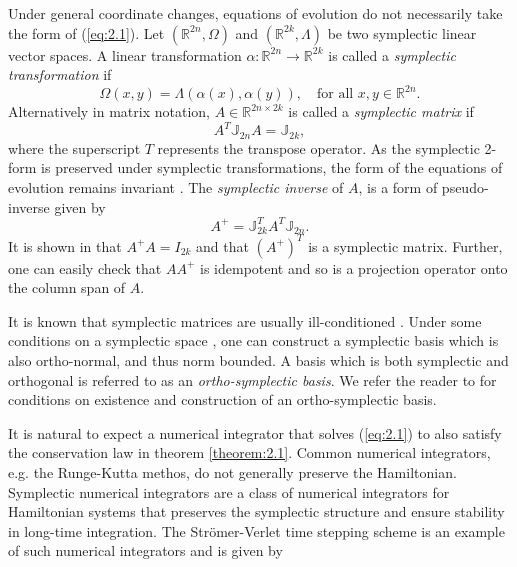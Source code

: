 Under general coordinate changes, equations of evolution do not necessarily take the form of (\ref{eq:2.1}). Let $(\mathbb R^{2n},\Omega)$ and $(\mathbb R^{2k},\Lambda)$ be two symplectic linear vector spaces. A linear transformation $\alpha :\mathbb R^{2n} \to \mathbb R^{2k}$ is called a \emph{symplectic transformation} \cite{Marsden:2010:IMS:1965128} if
\begin{equation}
	\Omega(x,y) = \Lambda(\alpha(x),\alpha(y)), \quad \text{for all } x,y\in \mathbb R^{2n}.
\end{equation}
Alternatively in matrix notation, $A\in \mathbb R^{2n\times 2k}$ is called a \emph{symplectic matrix} if
\begin{equation}
	A^T \mathbb{J}_{2n} A = \mathbb{J}_{2k},
\end{equation}
where the superscript $T$ represents the transpose operator. As the symplectic 2-form is preserved under symplectic transformations, the form of the equations of evolution remains invariant \cite{Marsden:2010:IMS:1965128}. The \emph{symplectic inverse} of $A$, is a form of pseudo-inverse given by
\begin{equation}
	A^+ = \mathbb{\mathbb J}_{2k}^T A^T \mathbb J_{2n}.
\end{equation}
It is shown in \cite{Peng:2014di} that $A^+A = I_{2k}$ and that $(A^+)^T$ is a symplectic matrix. Further, one can easily check that $AA^+$ is idempotent and so is a projection operator onto the column span of $A$. 

It is known that symplectic matrices are usually ill-conditioned \cite{Karow:2006cf}. Under some conditions on a symplectic space \cite{da2003introduction}, one can construct a symplectic basis which is also ortho-normal, and thus norm bounded. A basis which is both symplectic and orthogonal is referred to as an \emph{ortho-symplectic basis}. We refer the reader to \cite{da2003introduction} for conditions on existence and construction of an ortho-symplectic basis.

It is natural to expect a numerical integrator that solves (\ref{eq:2.1}) to also satisfy the conservation law in theorem \ref{theorem:2.1}. Common numerical integrators, e.g. the Runge-Kutta methos, do not generally preserve the Hamiltonian. Symplectic numerical integrators are a class of numerical integrators for Hamiltonian systems that preserves the symplectic structure and ensure stability in long-time integration. The Str\"omer-Verlet time stepping scheme is an example of such numerical integrators and is given by

